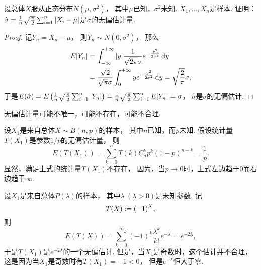 \begin{example}
设总体\(X\)服从正态分布\(N(\mu,\sigma^2)\)，
其中\(\mu\)已知，\(\sigma^2\)未知.
\(X_1,\dotsc,X_n\)是样本.
证明：\(\hat\sigma
= \frac1n \sqrt{\frac\pi2} \sum_{i=1}^n \abs{X_i - \mu}\)是\(\sigma\)的无偏估计量.
\begin{proof}
记\(Y_n = X_n-\mu\)，
则\(Y_n \sim N(0,\sigma^2)\)，
那么\begin{align*}
	E\abs{Y_n}
	&= \int_{-\infty}^{+\infty}
	\abs{y} \frac1{\sqrt{2\pi} \sigma}
	e^{-\frac{y^2}{2\sigma^2}} \dd{y} \\
	&= \frac{\sqrt2}{\sqrt\pi \sigma} \int_0^{+\infty}
	y e^{-\frac{y^2}{2\sigma^2}} \dd{y}
	= \sqrt{\frac2\pi} \sigma,
\end{align*}
于是\(E(\hat\sigma)
= E\left(\frac1n \sqrt{\frac\pi2} \sum_{i=1}^n \abs{Y_n}\right)
= \frac1n \sqrt{\frac\pi2} \sum_{i=1}^n E\abs{Y_n}
= \sigma\)，
\(\hat\sigma\)是\(\sigma\)的无偏估计.
\end{proof}
\end{example}

无偏估计量可能不唯一，可能不存在，可能不合理.

\begin{example}
设\(X_1\)是来自总体\(X \sim B(n,p)\)的样本，
其中\(n\)已知，而\(p\)未知.
假设统计量\(T(X_1)\)是参数\(1/p\)的无偏估计量，
则\begin{equation*}
	E(T(X_1))
	= \sum_{k=0}^n T(k) C_n^k p^k (1-p)^{n-k}
	= \frac1p.
\end{equation*}
显然，满足上式的统计量\(T(X_1)\)不存在，
因为，当\(p\to0\)时，上式左边趋于\(0\)而右边趋于\(\infty\).
\end{example}

\begin{example}
设\(X_1\)是来自总体\(P(\lambda)\)的样本，
其中\(\lambda\ (\lambda>0)\)是未知参数.
记\begin{equation*}
	T(X) := (-1)^X,
\end{equation*}
则\begin{equation*}
	E(T(X))
	= \sum_{k=0}^\infty (-1)^k \frac{\lambda^k}{k!} e^{-\lambda}
	= e^{-2\lambda},
\end{equation*}
于是\(T(X_1)\)是\(e^{-2\lambda}\)的一个无偏估计.
但是，当\(X_1\)是奇数时，这个估计并不合理，
这是因为当\(X_1\)是奇数时有\(T(X_1) = -1 < 0\)，
但是\(e^{-\lambda}\)恒大于零.
\end{example}

